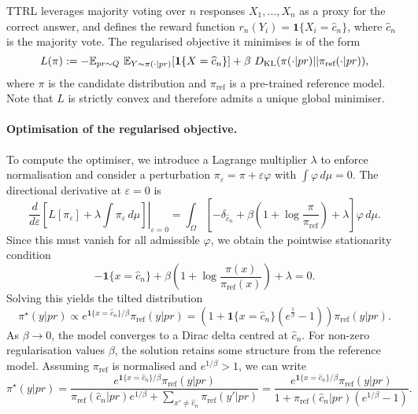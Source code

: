 TTRL leverages majority voting over $n$ responses $X_1, \dots, X_n$ as a proxy for the correct answer, and defines the reward function $r_n(Y_i) = \mathbf{1}\{X_i = \widehat{c}_n\}$, where $\widehat{c}_n$ is the majority vote. 
The regularised objective it minimises is of the form
$$
L(\pi) := -\mathbb{E}_{pr \sim Q}\ \mathbb{E}_{Y\sim \pi(\cdot | pr)}[\mathbf{1}\{X=\widehat{c}_n\}] + \beta\ \KL(\pi(\cdot | pr) || \pi_{\text{ref}}(\cdot | pr)),
$$
where $\pi$ is the candidate distribution and $\pi_{\text{ref}}$ is a pre-trained reference model. Note that $L$ is strictly convex and therefore admits a unique global minimiser.

\paragraph{Optimisation of the regularised objective.} To compute the optimiser, we introduce a Lagrange multiplier $\lambda$ to enforce normalisation and consider a perturbation
$\pi_\varepsilon = \pi + \varepsilon\varphi$ with $\int\varphi\,d\mu = 0$.
The directional derivative at $\varepsilon=0$ is
$$
\left.\frac{d}{d\varepsilon}
\left[ L[\pi_\varepsilon] + \lambda \int \pi_\varepsilon\,d\mu \right]
\right|_{\varepsilon=0}
=
\int_{\Omega} \left[-\delta_{\widehat{c}_n} + \beta\left(1+\log\frac{\pi}{\pi_{\text{ref}}}\right) + \lambda\right]\varphi\,d\mu .
$$
Since this must vanish for all admissible $\varphi$, we obtain the pointwise stationarity condition
$$
-\mathbf{1}\{x=\widehat{c}_n\} + \beta\left(1+\log\frac{\pi(x)}{\pi_{\text{ref}}(x)}\right) + \lambda = 0.
$$
Solving this yields the tilted distribution
\begin{equation*}
\pi^\star(y | pr) \propto e^{\mathbf{1}\{x=\widehat{c}_n\}/\beta}\pi_{\text{ref}}(y | pr) = \left(1 + \mathbf{1}\{x=\widehat{c}_n\}\left(e^{\frac{1}{\beta}}-1\right)\right)\pi_{\text{ref}}(y|pr).
\end{equation*}
As $\beta\rightarrow 0$, the model converges to a Dirac delta centred at $\widehat{c}_n$.   For non-zero regularisation values $\beta$, the solution retains some  structure from the reference model. Assuming $\pi_{\text{ref}}$ is normalised and $e^{1/\beta} > 1$, we can write
$$
\pi^\star(y | pr) = \frac{e^{\mathbf{1}\{x=\widehat{c}_n\}/\beta}\pi_{\text{ref}}(y| pr)}{\pi_{\text{ref}}(\widehat{c}_n|pr)e^{1/\beta} +\sum_{x'\neq \widehat{c}_n} \pi_{\text{ref}}(y'|pr)} =  \frac{e^{\mathbf{1}\{x=\widehat{c}_n\}/\beta}\pi_{\text{ref}}(y | pr)}{1 + \pi_{\text{ref}}(\widehat{c}_n|pr)(e^{1/\beta}-1)}. 
$$

